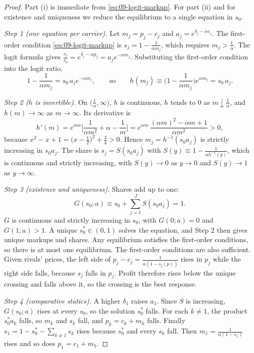 \begin{proof}
Part (i) is immediate from \eqref{eq:09-logit-markup}. For part (ii) and for existence and uniqueness we
reduce the equilibrium to a single equation in $s_0$.

\emph{Step 1 (one equation per carrier).} Let $m_j=p_j-c_j$ and $a_j=e^{\delta_j-\alpha c_j}$. The
first-order condition \eqref{eq:09-logit-markup} is $s_j=1-\frac{1}{\alpha m_j}$, which requires
$m_j>\frac{1}{\alpha}$. The logit formula gives
$\frac{s_j}{s_0}=e^{\delta_j-\alpha p_j}=a_je^{-\alpha m_j}$. Substituting the first-order condition
into the logit ratio,
\begin{equation*}
1-\frac{1}{\alpha m_j}=s_0\,a_je^{-\alpha m_j},
\qquad\text{so}\qquad
h(m_j)\equiv\Big(1-\frac{1}{\alpha m_j}\Big)e^{\alpha m_j}=s_0\,a_j .
\end{equation*}

\emph{Step 2 ($h$ is invertible).} On $\big(\frac{1}{\alpha},\infty\big)$, $h$ is continuous, $h$ tends
to $0$ as $m\downarrow\frac{1}{\alpha}$, and $h(m)\to\infty$ as $m\to\infty$. Its derivative is
\begin{equation*}
h'(m)=e^{\alpha m}\Big[\frac{1}{\alpha m^2}+\alpha-\frac{1}{m}\Big]
=e^{\alpha m}\,\frac{(\alpha m)^2-\alpha m+1}{\alpha m^2}>0,
\end{equation*}
because $x^2-x+1=\big(x-\frac{1}{2}\big)^2+\frac{3}{4}>0$. Hence $m_j=h^{-1}(s_0a_j)$ is strictly
increasing in $s_0a_j$. The share is $s_j=S(s_0a_j)$ with
$S(y)\equiv1-\frac{1}{\alpha h^{-1}(y)}$, which is continuous and strictly increasing, with $S(y)\to0$ as
$y\to0$ and $S(y)\to1$ as $y\to\infty$.

\emph{Step 3 (existence and uniqueness).} Shares add up to one:
\begin{equation*}
G(s_0;a)\equiv s_0+\sum_{j=1}^J S(s_0a_j)=1 .
\end{equation*}
$G$ is continuous and strictly increasing in $s_0$, with $G(0;a)=0$ and $G(1;a)>1$. A unique
$s_0^*\in(0,1)$ solves the equation, and Step 2 then gives unique markups and shares. Any equilibrium
satisfies the first-order conditions, so there is at most one equilibrium. The first-order conditions
are also sufficient. Given rivals' prices, the left side of $p_j-c_j=\frac{1}{\alpha(1-s_j(p))}$ rises in
$p_j$ while the right side falls, because $s_j$ falls in $p_j$. Profit therefore rises below the unique
crossing and falls above it, so the crossing is the best response.

\emph{Step 4 (comparative statics).} A higher $\delta_1$ raises $a_1$. Since $S$ is increasing,
$G(s_0;a)$ rises at every $s_0$, so the solution $s_0^*$ falls. For each $k\neq1$, the product
$s_0^*a_k$ falls, so $m_k$ and $s_k$ fall, and $p_k=c_k+m_k$ falls. Finally
$s_1=1-s_0^*-\sum_{k\neq1}s_k$ rises because $s_0^*$ and every $s_k$ fall. Then
$m_1=\frac{1}{\alpha(1-s_1)}$ rises and so does $p_1=c_1+m_1$.
\end{proof}

